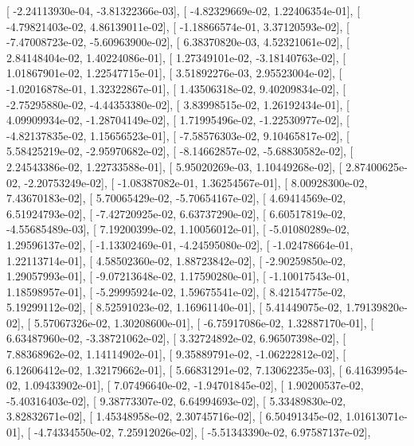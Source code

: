 \documentclass{article}
\begin{document}
       [ -2.24113930e-04,  -3.81322366e-03],
       [ -4.82329669e-02,   1.22406354e-01],
       [ -4.79821403e-02,   4.86139011e-02],
       [ -1.18866574e-01,   3.37120593e-02],
       [ -7.47008723e-02,  -5.60963900e-02],
       [  6.38370820e-03,   4.52321061e-02],
       [  2.84148404e-02,   1.40224086e-01],
       [  1.27349101e-02,  -3.18140763e-02],
       [  1.01867901e-02,   1.22547715e-01],
       [  3.51892276e-03,   2.95523004e-02],
       [ -1.02016878e-01,   1.32322867e-01],
       [  1.43506318e-02,   9.40209834e-02],
       [ -2.75295880e-02,  -4.44353380e-02],
       [  3.83998515e-02,   1.26192434e-01],
       [  4.09909934e-02,  -1.28704149e-02],
       [  1.71995496e-02,  -1.22530977e-02],
       [ -4.82137835e-02,   1.15656523e-01],
       [ -7.58576303e-02,   9.10465817e-02],
       [  5.58425219e-02,  -2.95970682e-02],
       [ -8.14662857e-02,  -5.68830582e-02],
       [  2.24543386e-02,   1.22733588e-01],
       [  5.95020269e-03,   1.10449268e-02],
       [  2.87400625e-02,  -2.20753249e-02],
       [ -1.08387082e-01,   1.36254567e-01],
       [  8.00928300e-02,   7.43670183e-02],
       [  5.70065429e-02,  -5.70654167e-02],
       [  4.69414569e-02,   6.51924793e-02],
       [ -7.42720925e-02,   6.63737290e-02],
       [  6.60517819e-02,  -4.55685489e-03],
       [  7.19200399e-02,   1.10056012e-01],
       [ -5.01080289e-02,   1.29596137e-02],
       [ -1.13302469e-01,  -4.24595080e-02],
       [ -1.02478664e-01,   1.22113714e-01],
       [  4.58502360e-02,   1.88723842e-02],
       [ -2.90259850e-02,   1.29057993e-01],
       [ -9.07213648e-02,   1.17590280e-01],
       [ -1.10017543e-01,   1.18598957e-01],
       [ -5.29995924e-02,   1.59675541e-02],
       [  8.42154775e-02,   5.19299112e-02],
       [  8.52591023e-02,   1.16961140e-01],
       [  5.41449075e-02,   1.79139820e-02],
       [  5.57067326e-02,   1.30208600e-01],
       [ -6.75917086e-02,   1.32887170e-01],
       [  6.63487960e-02,  -3.38721062e-02],
       [  3.32724892e-02,   6.96507398e-02],
       [  7.88368962e-02,   1.14114902e-01],
       [  9.35889791e-02,  -1.06222812e-02],
       [  6.12606412e-02,   1.32179662e-01],
       [  5.66831291e-02,   7.13062235e-03],
       [  6.41639954e-02,   1.09433902e-01],
       [  7.07496640e-02,  -1.94701845e-02],
       [  1.90200537e-02,  -5.40316403e-02],
       [  9.38773307e-02,   6.64994693e-02],
       [  5.33489830e-02,   3.82832671e-02],
       [  1.45348958e-02,   2.30745716e-02],
       [  6.50491345e-02,   1.01613071e-01],
       [ -4.74334550e-02,   7.25912026e-02],
       [ -5.51343390e-02,   6.97587137e-02],
\end{document}
